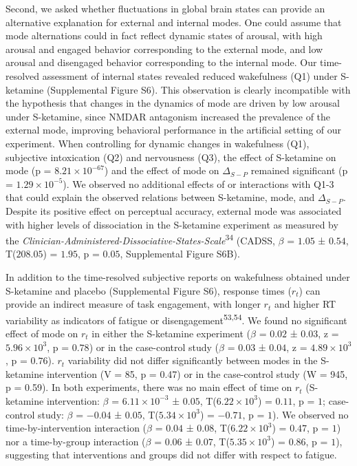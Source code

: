 \documentclass[
]{article}
\begin{document}
Second, we asked whether fluctuations in global brain states can provide
an alternative explanation for external and internal modes. One could
assume that mode alternations could in fact reflect dynamic states of
arousal, with high arousal and engaged behavior corresponding to the
external mode, and low arousal and disengaged behavior corresponding to
the internal mode. Our time-resolved assessment of internal states
revealed reduced wakefulness (Q1) under S-ketamine (Supplemental Figure
S6). This observation is clearly incompatible with the hypothesis that
changes in the dynamics of mode are driven by low arousal under
S-ketamine, since NMDAR antagonism increased the prevalence of the
external mode, improving behavioral performance in the artificial
setting of our experiment. When controlling for dynamic changes in
wakefulness (Q1), subjective intoxication (Q2) and nervousness (Q3), the
effect of S-ketamine on mode (p = \(\ensuremath{8.21\times 10^{-67}}\))
and the effect of mode on \(\Delta_{S-P}\) remained significant (p =
\(\ensuremath{1.29\times 10^{-5}}\)). We observed no additional effects
of or interactions with Q1-3 that could explain the observed relations
between S-ketamine, mode, and \(\Delta_{S-P}\). Despite its positive
effect on perceptual accuracy, external mode was associated with higher
levels of dissociation in the S-ketamine experiment as measured by the
\emph{Clinician-Administered-Dissociative-States-Scale}\textsuperscript{34}
(CADSS, \(\beta\) = \(1.05\) ± \(0.54\), T(\(208.05\)) = \(1.95\), p =
\(0.05\), Supplemental Figure S6B).

In addition to the time-resolved subjective reports on wakefulness
obtained under S-ketamine and placebo (Supplemental Figure S6), response
times (\(r_t\)) can provide an indirect measure of task engagement, with
longer \(r_t\) and higher RT variability as indicators of fatigue or
disengagement\textsuperscript{53,54}. We found no significant effect of
mode on \(r_t\) in either the S-ketamine experiment (\(\beta\) =
\(0.02\) ± \(0.03\), z = \(\ensuremath{5.96\times 10^{3}}\), p =
\(0.78\)) or in the case-control study (\(\beta\) = \(0.03\) ± \(0.04\),
z = \(\ensuremath{4.89\times 10^{3}}\), p = \(0.76\)). \(r_t\)
variability did not differ significantly between modes in the S-ketamine
intervention (V = 85, p = 0.47) or in the case-control study (W = 945, p
= 0.59). In both experiments, there was no main effect of time on
\(r_t\) (S-ketamine intervention: \(\beta\) =
\(\ensuremath{6.11\times 10^{-3}}\) ± \(0.05\),
T(\(\ensuremath{6.22\times 10^{3}}\)) = \(0.11\), p = \(1\);
case-control study: \(\beta\) = \(-0.04\) ± \(0.05\),
T(\(\ensuremath{5.34\times 10^{3}}\)) = \(-0.71\), p = \(1\)). We
observed no time-by-intervention interaction (\(\beta\) = \(0.04\) ±
\(0.08\), T(\(\ensuremath{6.22\times 10^{3}}\)) = \(0.47\), p = \(1\))
nor a time-by-group interaction (\(\beta\) = \(0.06\) ± \(0.07\),
T(\(\ensuremath{5.35\times 10^{3}}\)) = \(0.86\), p = \(1\)), suggesting
that interventions and groups did not differ with respect to fatigue.
\end{document}
